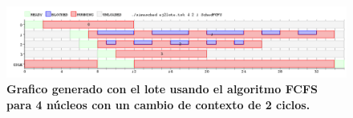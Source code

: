\begin{figure}[!h]
	\begin{center}
		\includegraphics[width=500px]{imagenes/ej2_4.png}
		\caption{\small{\textbf{Grafico generado con el lote usando el algoritmo FCFS para 4 núcleos con un cambio de contexto de 2 ciclos.}}}
		\label{fig:grafico_ej2_4}
	\end{center}
\end{figure}